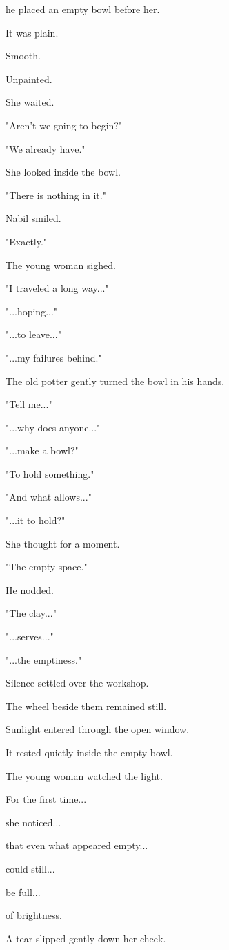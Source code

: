 \documentclass[12pt,openany]{book}
\begin{document}
he placed an empty bowl before her.

It was plain.

Smooth.

Unpainted.

She waited.

"Aren't we going to begin?"

"We already have."

She looked inside the bowl.

"There is nothing in it."

Nabil smiled.

"Exactly."

The young woman sighed.

"I traveled a long way..."

"...hoping..."

"...to leave..."

"...my failures behind."

The old potter gently turned the bowl in his hands.

"Tell me..."

"...why does anyone..."

"...make a bowl?"

"To hold something."

"And what allows..."

"...it to hold?"

She thought for a moment.

"The empty space."

He nodded.

"The clay..."

"...serves..."

"...the emptiness."

Silence settled over the workshop.

The wheel beside them remained still.

Sunlight entered through the open window.

It rested quietly inside the empty bowl.

The young woman watched the light.

For the first time...

she noticed...

that even what appeared empty...

could still...

be full...

of brightness.

A tear slipped gently down her cheek.
\end{document}
